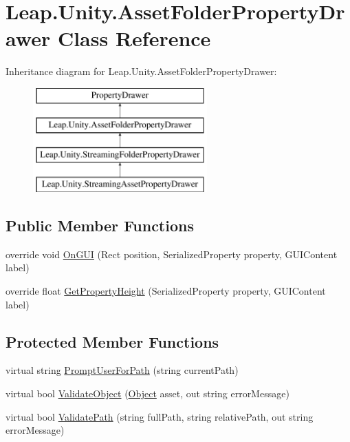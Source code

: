 \hypertarget{class_leap_1_1_unity_1_1_asset_folder_property_drawer}{}\section{Leap.\+Unity.\+Asset\+Folder\+Property\+Drawer Class Reference}
\label{class_leap_1_1_unity_1_1_asset_folder_property_drawer}
Inheritance diagram for Leap.\+Unity.\+Asset\+Folder\+Property\+Drawer\+:\begin{figure}[H]
\begin{center}
\leavevmode
\includegraphics[height=4.000000cm]{class_leap_1_1_unity_1_1_asset_folder_property_drawer}
\end{center}
\end{figure}
\subsection*{Public Member Functions}
\begin{DoxyCompactItemize}
\item 
override void \mbox{\hyperlink{class_leap_1_1_unity_1_1_asset_folder_property_drawer_af800a23a840208fb890ab61022942301}{On\+G\+UI}} (Rect position, Serialized\+Property property, G\+U\+I\+Content label)
\item 
override float \mbox{\hyperlink{class_leap_1_1_unity_1_1_asset_folder_property_drawer_a3b57e2738c7c482308b07f3ebfbce706}{Get\+Property\+Height}} (Serialized\+Property property, G\+U\+I\+Content label)
\end{DoxyCompactItemize}
\subsection*{Protected Member Functions}
\begin{DoxyCompactItemize}
\item 
virtual string \mbox{\hyperlink{class_leap_1_1_unity_1_1_asset_folder_property_drawer_adf5a06cc37ba9285efd63ac70c08c5d0}{Prompt\+User\+For\+Path}} (string current\+Path)
\item 
virtual bool \mbox{\hyperlink{class_leap_1_1_unity_1_1_asset_folder_property_drawer_a12d6bf97d917cba11f0036ff110530f2}{Validate\+Object}} (\mbox{\hyperlink{_t_m_pro___font_asset_creator_window_8cs_aef19bab18b9814edeef255c43e4f6bbc}{Object}} asset, out string error\+Message)
\item 
virtual bool \mbox{\hyperlink{class_leap_1_1_unity_1_1_asset_folder_property_drawer_a758121df1db1aa0c8e81154f239297a6}{Validate\+Path}} (string full\+Path, string relative\+Path, out string error\+Message)
\end{DoxyCompactItemize}


